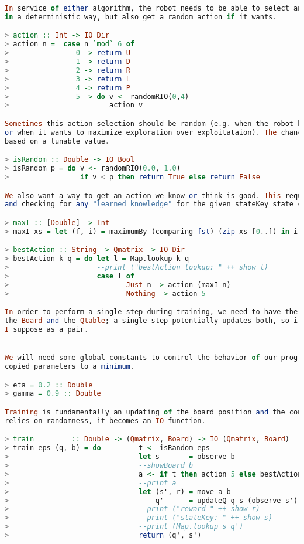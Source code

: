 \documentclass[12pt,a4paper]{article}
\begin{document}
\begin{lstlisting}[language=Haskell,numbers=none,basicstyle=\tiny]
In service of either algorithm, the robot needs to be able to select an action 
in a deterministic way, but also get a random action if it wants.

> action :: Int -> IO Dir
> action n =  case n `mod` 6 of
>                0 -> return U
>                1 -> return D
>                2 -> return R
>                3 -> return L
>                4 -> return P
>                5 -> do v <- randomRIO(0,4)
>                        action v

Sometimes this action selection should be random (e.g. when the robot has not learned enough,
or when it wants to maximize exploration over exploitataion). The chances of randomness should be 
based on a tunable value.

> isRandom :: Double -> IO Bool
> isRandom p = do v <- randomRIO(0.0, 1.0)
>                 if v < p then return True else return False

We also want a way to get an action we know or think is good. This requires looking at the Qmatrix
and checking for any "learned knowledge" for the given stateKey state configuration.

> maxI :: [Double] -> Int
> maxI xs = let (f, i) = maximumBy (comparing fst) (zip xs [0..]) in i

> bestAction :: String -> Qmatrix -> IO Dir
> bestAction k q = do let l = Map.lookup k q
>                     --print ("bestAction lookup: " ++ show l)
>                     case l of
>                            Just n -> action (maxI n)
>                            Nothing -> action 5

In order to perform a single step during training, we need to have the updated states of
the Board and the Qtable; a single step potentially updates both, so it should return them,
I suppose as a pair.


We will need some global constants to control the behavior of our program and keep the number of
copied parameters to a minimum.

> eta = 0.2 :: Double
> gamma = 0.9 :: Double

Training is fundamentally an updating of the board position and the contents of the Qmatrix. Because it
relies on randomness, it becomes an IO function. 

> train         :: Double -> (Qmatrix, Board) -> IO (Qmatrix, Board)
> train eps (q, b) = do         t <- isRandom eps
>                               let s       = observe b
>                               --showBoard b
>                               a <- if t then action 5 else bestAction s q
>                               --print a
>                               let (s', r) = move a b
>                                   q'      = updateQ q s (observe s') a r
>                               --print ("reward " ++ show r)
>                               --print ("stateKey: " ++ show s)
>                               --print (Map.lookup s q')
>                               return (q', s')


\end{lstlisting}
\end{document}
